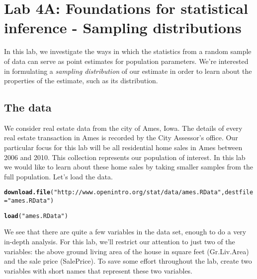 \documentclass{article}\usepackage[]{graphicx}\usepackage[]{color}
\makeatletter
\newcommand{\hlstr}[1]{\textcolor[rgb]{0.192,0.494,0.8}{#1}}%
\newcommand{\hlstd}[1]{\textcolor[rgb]{0.345,0.345,0.345}{#1}}%
\newcommand{\hlkwc}[1]{\textcolor[rgb]{0.333,0.667,0.333}{#1}}%
\newcommand{\hlkwd}[1]{\textcolor[rgb]{0.737,0.353,0.396}{\textbf{#1}}}%
\newenvironment{kframe}{%
 \def\at@end@of@kframe{}%
 \ifinner\ifhmode%
  \def\at@end@of@kframe{\end{minipage}}%
  \begin{minipage}{\columnwidth}%
 \fi\fi%
 \def\FrameCommand##1{\hskip\@totalleftmargin \hskip-\fboxsep
 \colorbox{shadecolor}{##1}\hskip-\fboxsep
     \hskip-\linewidth \hskip-\@totalleftmargin \hskip\columnwidth}%
 \MakeFramed {\advance\hsize-\width
   \@totalleftmargin\z@ \linewidth\hsize
   \@setminipage}}%
 {\par\unskip\endMakeFramed%
 \at@end@of@kframe}
\newenvironment{knitrout}{}{} %
\makeatother
\begin{document}

\section*{Lab 4A: Foundations for statistical inference - Sampling distributions}
In this lab, we investigate the ways in which the statistics from a random sample of data can serve as point estimates for population parameters.  We're interested in formulating a \emph{sampling distribution} of our estimate in order to learn about the properties of the estimate, such as its distribution.

\subsection*{The data}
We consider real estate data from the city of Ames, Iowa.  The details of every real estate transaction in Ames is recorded by the City Assessor's office.  Our particular focus for this lab will be all residential home sales in Ames between 2006 and 2010.  This collection represents our population of interest.  In this lab we would like to learn about these home sales by taking smaller samples from the full population.  Let's load the data.

\begin{knitrout}
\color{fgcolor}\begin{kframe}
\begin{alltt}
\hlkwd{download.file}\hlstd{(}\hlstr{"http://www.openintro.org/stat/data/ames.RData"}\hlstd{,} \hlkwc{destfile} \hlstd{=} \hlstr{"ames.RData"}\hlstd{)}

\hlkwd{load}\hlstd{(}\hlstr{"ames.RData"}\hlstd{)}
\end{alltt}
\end{kframe}
\end{knitrout}


We see that there are quite a few variables in the data set, enough to do a very in-depth analysis.  For this lab, we'll restrict our attention to just two of the variables: the above ground living area of the house in square feet (\hlstd{Gr.Liv.Area}) and the sale price (\hlstd{SalePrice}).  To save some effort throughout the lab, create two variables with short names that represent these two variables.  
\end{document}
